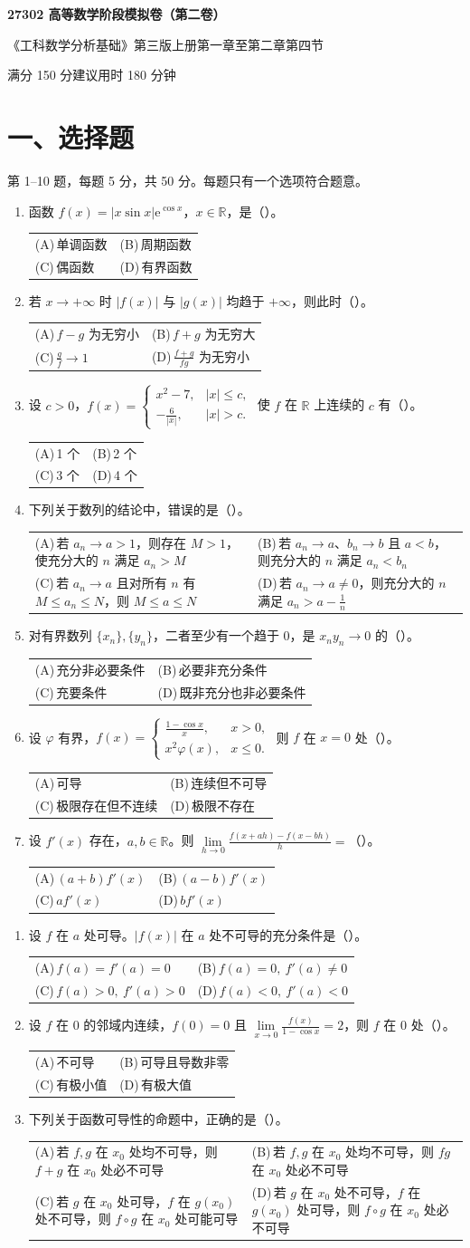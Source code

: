 \documentclass[UTF8,a4paper,zihao=-4,fontset=fandol]{ctexart}
\makeatletter
\renewcommand{\lim}{\operatorname*{lim}\limits}
\newcommand{\choices}[4]{%
  \par\noindent\begin{tabularx}{\linewidth}{@{}X@{\hspace{1em}}X@{}}
    (A)\,#1 & (B)\,#2 \\
    (C)\,#3 & (D)\,#4
  \end{tabularx}\par}
\newcommand{\paper}[1]{%
  \pdfbookmark[0]{第#1卷}{paper.\thepage}%
  \begin{center}
    {\LARGE\bfseries 27302 高等数学阶段模拟卷（第#1卷）\par}
    \small 《工科数学分析基础》第三版上册第一章至第二章第四节\par
    满分 150 分\qquad 建议用时 180 分钟
  \end{center}
  \section*{一、选择题}
  第 1--10 题，每题 5 分，共 50 分。每题只有一个选项符合题意。}
\makeatother
\begin{document}
\paper{二}
\begin{enumerate}
\item 函数 $f(x)=|x\sin x|\mathrm{e}^{\cos x}$，$x\in\mathbb R$，是（\quad）。
\choices{单调函数}{周期函数}{偶函数}{有界函数}
\item 若 $x\to+\infty$ 时 $|f(x)|$ 与 $|g(x)|$ 均趋于 $+\infty$，则此时（\quad）。
\choices{$f-g$ 为无穷小}{$f+g$ 为无穷大}{$\frac{g}{f}\to1$}{$\frac{f+g}{fg}$ 为无穷小}
\item 设 $c>0$，$f(x)=\begin{cases}x^2-7,&|x|\le c,\\-\frac{6}{|x|},&|x|>c.\end{cases}$
使 $f$ 在 $\mathbb R$ 上连续的 $c$ 有（\quad）。
\choices{1 个}{2 个}{3 个}{4 个}
\item 下列关于数列的结论中，错误的是（\quad）。
\choices{若 $a_n\to a>1$，则存在 $M>1$，使充分大的 $n$ 满足 $a_n>M$}
{若 $a_n\to a$、$b_n\to b$ 且 $a<b$，则充分大的 $n$ 满足 $a_n<b_n$}
{若 $a_n\to a$ 且对所有 $n$ 有 $M\le a_n\le N$，则 $M\le a\le N$}
{若 $a_n\to a\ne0$，则充分大的 $n$ 满足 $a_n>a-\frac{1}{n}$}
\item 对有界数列 $\{x_n\},\{y_n\}$，二者至少有一个趋于 $0$，是 $x_ny_n\to0$ 的（\quad）。
\choices{充分非必要条件}{必要非充分条件}{充要条件}{既非充分也非必要条件}
\item 设 $\varphi$ 有界，$f(x)=\begin{cases}\frac{1-\cos x}{x},&x>0,\\x^2\varphi(x),&x\le0.\end{cases}$
则 $f$ 在 $x=0$ 处（\quad）。
\choices{可导}{连续但不可导}{极限存在但不连续}{极限不存在}
\item 设 $f'(x)$ 存在，$a,b\in\mathbb R$。则 $\displaystyle
\lim_{h\to0}\frac{f(x+ah)-f(x-bh)}{h}=$（\quad）。
\choices{$(a+b)f'(x)$}{$(a-b)f'(x)$}{$af'(x)$}{$bf'(x)$}
\end{enumerate}
\newpage
\begin{enumerate}[start=8]
\item 设 $f$ 在 $a$ 处可导。$|f(x)|$ 在 $a$ 处不可导的充分条件是（\quad）。
\choices{$f(a)=f'(a)=0$}{$f(a)=0,\ f'(a)\ne0$}{$f(a)>0,\ f'(a)>0$}{$f(a)<0,\ f'(a)<0$}
\item 设 $f$ 在 $0$ 的邻域内连续，$f(0)=0$ 且
$\displaystyle\lim_{x\to0}\frac{f(x)}{1-\cos x}=2$，则 $f$ 在 $0$ 处（\quad）。
\choices{不可导}{可导且导数非零}{有极小值}{有极大值}
\item 下列关于函数可导性的命题中，正确的是（\quad）。
\choices{若 $f,g$ 在 $x_0$ 处均不可导，则 $f+g$ 在 $x_0$ 处必不可导}
{若 $f,g$ 在 $x_0$ 处均不可导，则 $fg$ 在 $x_0$ 处必不可导}
{若 $g$ 在 $x_0$ 处可导，$f$ 在 $g(x_0)$ 处不可导，则 $f\circ g$ 在 $x_0$ 处可能可导}
{若 $g$ 在 $x_0$ 处不可导，$f$ 在 $g(x_0)$ 处可导，则 $f\circ g$ 在 $x_0$ 处必不可导}
\end{enumerate}
\end{document}
